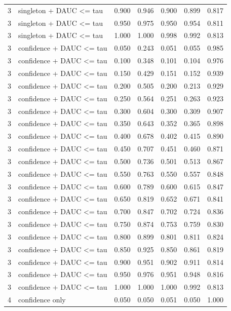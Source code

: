 \begin{tabular}{rlrrrrr}
3 & singleton + DAUC <= tau & 0.900 & 0.946 & 0.900 & 0.899 & 0.817 \\
3 & singleton + DAUC <= tau & 0.950 & 0.975 & 0.950 & 0.954 & 0.811 \\
3 & singleton + DAUC <= tau & 1.000 & 1.000 & 0.998 & 0.992 & 0.813 \\
3 & confidence + DAUC <= tau & 0.050 & 0.243 & 0.051 & 0.055 & 0.985 \\
3 & confidence + DAUC <= tau & 0.100 & 0.348 & 0.101 & 0.104 & 0.976 \\
3 & confidence + DAUC <= tau & 0.150 & 0.429 & 0.151 & 0.152 & 0.939 \\
3 & confidence + DAUC <= tau & 0.200 & 0.505 & 0.200 & 0.213 & 0.929 \\
3 & confidence + DAUC <= tau & 0.250 & 0.564 & 0.251 & 0.263 & 0.923 \\
3 & confidence + DAUC <= tau & 0.300 & 0.604 & 0.300 & 0.309 & 0.907 \\
3 & confidence + DAUC <= tau & 0.350 & 0.643 & 0.352 & 0.365 & 0.898 \\
3 & confidence + DAUC <= tau & 0.400 & 0.678 & 0.402 & 0.415 & 0.890 \\
3 & confidence + DAUC <= tau & 0.450 & 0.707 & 0.451 & 0.460 & 0.871 \\
3 & confidence + DAUC <= tau & 0.500 & 0.736 & 0.501 & 0.513 & 0.867 \\
3 & confidence + DAUC <= tau & 0.550 & 0.763 & 0.550 & 0.557 & 0.848 \\
3 & confidence + DAUC <= tau & 0.600 & 0.789 & 0.600 & 0.615 & 0.847 \\
3 & confidence + DAUC <= tau & 0.650 & 0.819 & 0.652 & 0.671 & 0.841 \\
3 & confidence + DAUC <= tau & 0.700 & 0.847 & 0.702 & 0.724 & 0.836 \\
3 & confidence + DAUC <= tau & 0.750 & 0.874 & 0.753 & 0.759 & 0.830 \\
3 & confidence + DAUC <= tau & 0.800 & 0.899 & 0.801 & 0.811 & 0.824 \\
3 & confidence + DAUC <= tau & 0.850 & 0.925 & 0.850 & 0.861 & 0.819 \\
3 & confidence + DAUC <= tau & 0.900 & 0.951 & 0.902 & 0.911 & 0.814 \\
3 & confidence + DAUC <= tau & 0.950 & 0.976 & 0.951 & 0.948 & 0.816 \\
3 & confidence + DAUC <= tau & 1.000 & 1.000 & 1.000 & 0.992 & 0.813 \\
4 & confidence only & 0.050 & 0.050 & 0.051 & 0.050 & 1.000 \\

\end{tabular}
